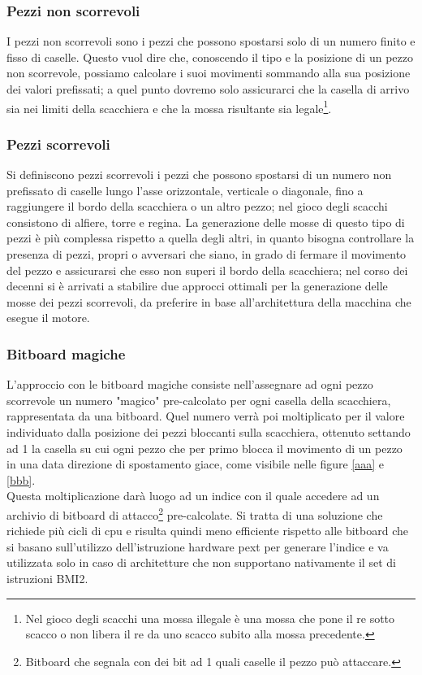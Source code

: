 \subsubsection{Pezzi non scorrevoli}
I pezzi non scorrevoli sono i pezzi che possono spostarsi solo di un numero finito e fisso di caselle. Questo vuol dire che, conoscendo il tipo e la posizione di un pezzo non scorrevole, possiamo calcolare i suoi movimenti
sommando alla sua posizione dei valori prefissati; a quel punto dovremo solo assicurarci che la casella di arrivo sia nei limiti della scacchiera e che la mossa risultante sia legale\footnote{Nel gioco degli scacchi una mossa illegale è una mossa che pone il re sotto scacco o non libera il re da uno scacco subito alla mossa precedente.}.

\subsubsection{Pezzi  scorrevoli}
Si definiscono pezzi scorrevoli i pezzi che possono spostarsi di un numero non prefissato di caselle lungo l'asse orizzontale, verticale o diagonale, fino a raggiungere il bordo della scacchiera o un altro pezzo; nel gioco degli scacchi consistono di alfiere, torre e regina. La generazione delle mosse di questo tipo di pezzi è più complessa rispetto a quella degli altri, in quanto bisogna controllare la presenza di pezzi, propri
o avversari che siano, in grado di fermare il movimento del pezzo e assicurarsi che esso non superi il bordo della scacchiera;
nel corso  dei decenni si è arrivati a stabilire due approcci ottimali per la generazione delle mosse dei pezzi scorrevoli, 
da preferire in base all'architettura della macchina che esegue il motore.

\subsubsection{Bitboard magiche}
L'approccio con le bitboard magiche consiste nell'assegnare ad ogni pezzo scorrevole un numero "magico" pre-calcolato per ogni casella della scacchiera, rappresentata da una bitboard. Quel numero verrà poi moltiplicato
 per il valore individuato dalla posizione dei pezzi bloccanti sulla scacchiera, ottenuto settando ad 1 la casella su cui ogni pezzo che per primo blocca il movimento di un pezzo in una data direzione di spostamento giace, come 
 visibile nelle  figure \ref{aaa} e \ref{bbb}.\\  
Questa moltiplicazione darà luogo ad un indice con il quale accedere ad un archivio di bitboard di 
attacco\footnote{Bitboard che segnala con dei bit ad 1 quali caselle il pezzo può attaccare.} pre-calcolate. Si tratta di una soluzione che richiede più cicli di cpu e risulta quindi meno efficiente rispetto alle bitboard che si basano sull'utilizzo dell'istruzione hardware pext per generare l'indice
e va utilizzata solo in caso di architetture che non supportano nativamente il set di istruzioni BMI2.


